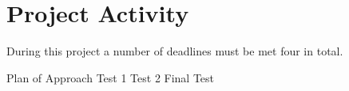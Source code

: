 \section{Project Activity}
During this project a number of deadlines must be met four in total. 

Plan of Approach
Test 1
Test 2
Final Test